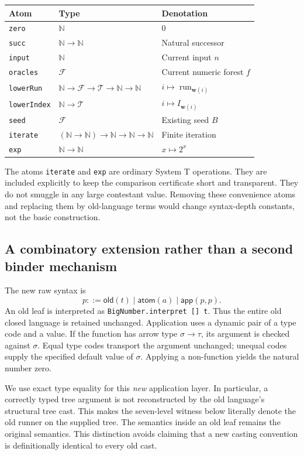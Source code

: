 \documentclass[11pt]{article}
\theoremstyle{definition}
\theoremstyle{remark}
\newcommand{\N}{\mathbb N}
\newcommand{\Tree}{\mathcal T}
\newcommand{\Fam}{\mathcal F}
\newcommand{\code}[1]{\texttt{#1}}
\newcommand{\ctx}{\boldsymbol w}
\begin{document}
\begin{center}
\small
\begin{tabularx}{\linewidth}{@{}l l X@{}}
\toprule
Atom & Type & Denotation\\
\midrule
\code{zero} & $\N$ & $0$\\
\code{succ} & $\N\to\N$ & Natural successor\\
\code{input} & $\N$ & Current input $n$\\
\code{oracles} & $\Fam$ & Current numeric forest $f$\\
\code{lowerRun} & $\N\to\Fam\to\Tree\to\N\to\N$ & $i\mapsto\operatorname{run}_{\ctx(i)}$\\
\code{lowerIndex} & $\N\to\Tree$ & $i\mapsto I_{\ctx(i)}$\\
\code{seed} & $\Fam$ & Existing seed $B$\\
\code{iterate} & $(\N\to\N)\to\N\to\N\to\N$ & Finite iteration\\
\code{exp} & $\N\to\N$ & $x\mapsto2^x$\\
\bottomrule
\end{tabularx}
\end{center}

The atoms \code{iterate} and \code{exp} are ordinary System T operations.
They are included explicitly to keep the comparison certificate short and
transparent. They do not smuggle in any large contestant value. Removing
these convenience atoms and replacing them by old-language terms would
change syntax-depth constants, not the basic construction.

\subsection{A combinatory extension rather than a second binder mechanism}

The new raw syntax is
\[
 p::=\mathsf{old}(t)\mid\mathsf{atom}(a)\mid\mathsf{app}(p,p).
\]
An old leaf is interpreted as \code{BigNumber.interpret [] t}. Thus the entire
old closed language is retained unchanged. Application uses a dynamic pair
of a type code and a value. If the function has arrow type $\sigma\to\tau$,
its argument is checked against $\sigma$. Equal type codes transport the
argument unchanged; unequal codes supply the specified default value of
$\sigma$. Applying a non-function yields the natural number zero.

We use exact type equality for this \emph{new} application layer. In
particular, a correctly typed tree argument is not reconstructed by the old
language's structural tree cast. This makes the seven-level witness below
literally denote the old runner on the supplied tree. The semantics inside
an old leaf remains the original semantics. This distinction avoids claiming
that a new casting convention is definitionally identical to every old cast.
\end{document}
